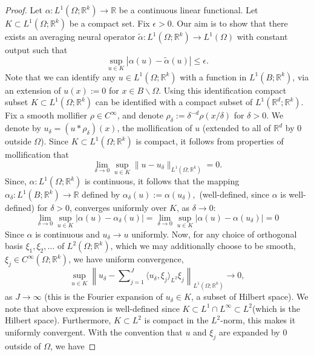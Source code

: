 \documentclass[reqno,9pt]{amsart}
\theoremstyle{plain}
\theoremstyle{definition}
\newcommand{\bb}[1]{\mathbb{#1}}
\begin{document}
\begin{proof}
    Let $\alpha: L^1(\Omega; \bb R^k) \to \bb R$ be a continuous linear functional. Let $K \subset L^1(\Omega; \bb R^k)$ be a compact set. Fix $\epsilon > 0$. Our aim is to show that there exists an averaging neural operator $\tilde{\alpha} : L^1(\Omega; \bb R^k) \to L^1(\Omega)$ with constant output such that 
    $$ \sup\limits_{u \in K} |\alpha(u) - \tilde{\alpha}(u)| \leq \epsilon.$$
    Note that we can identify any $u \in L^1(\Omega; \bb R^k)$ with a function in $L^1(B; \bb R^k)$, via an extension of $u(x):= 0$ for $x \in B\backslash \Omega$. Using this identification compact subset $K \subset L^1(\Omega; \bb R^k)$ can be identified with a compact subset of $L^1(\bb R^d; \bb R^k)$. Fix a smooth mollifier $\rho \in C^\infty$, and denote $\rho_\delta:= \delta^{-d}\rho(x/\delta)$ for $\delta > 0$. We denote by $u_\delta = (u * \rho_\delta)(x)$, the mollification of $u$ (extended to all of $\bb R^d$ by $0$ outside $\Omega$). Since $K \subset L^1(\Omega; \bb R^k)$ is compact, it follows from properties of mollification that
    $$ \lim_{\delta \to 0} \sup\limits_{u \in K}\|u - u_\delta\|_{L^1(\Omega;\bb R^k)} = 0.$$
    Since, $\alpha : L^1(\Omega;\bb R^k)$ is continuous, it follows that the mapping $\alpha_\delta : L^1(B;\bb R^k) \to \bb R$ defined by $\alpha_\delta(u) := \alpha(u_\delta),$ (well-defined, since $\alpha$ is well-defined) for $\delta > 0$, converges uniformly over $K$, as $\delta \to 0$:
    \begin{equation} \label{6}
        \lim_{\delta \to 0}\sup\limits_{u \in K}|\alpha(u) - \alpha_\delta(u)| = \lim_{\delta \to 0}\sup\limits_{u \in K}|\alpha(u) - \alpha(u_\delta)| = 0
    \end{equation}
    Since $\alpha$ is continuous and $u_\delta \to u$ uniformly. Now, for any choice of orthogonal basis $\xi_1, \xi_2, \dots$ of $L^2(\Omega; \bb R^k)$, which we may additionally choose to be smooth, $\xi_j \in C^\infty(\Omega; \bb R^k)$, we have uniform convergence,
    \begin{equation} \label{7}
        \sup_{u \in K} \left\|u_\delta - \sum\nolimits_{j=1}^{J}\langle u_\delta, \xi_j\rangle_{L^2} \xi_j\right\|_{L^1(\Omega; \bb R^k)} \to 0,
    \end{equation}
    as $J \to \infty$ (this is the Fourier expansion of $u_\delta \in K$, a subset of Hilbert space). We note that above expression is well-defined since $K \subset L^1 \cap L^\infty \subset L^2$(which is the Hilbert space). Furthermore, $K \subset L^2$ is compact in the $L^2$-norm, this makes it uniformly convergent. With the convention that $u$ and $\xi_j$ are expanded by $0$ outside of $\Omega$, we have

\end{proof}
\end{document}

